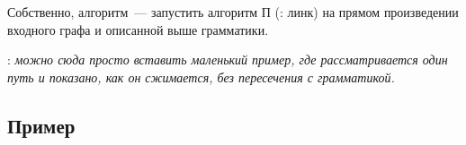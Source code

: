 Собственно, алгоритм~--- запустить алгоритм П (\TODO: линк) на прямом произведении входного графа и описанной выше грамматики.


\TODO: \textit{можно сюда просто вставить маленький пример, где рассматривается один путь и показано, как он сжимается, без пересечения с грамматикой.}


\subsection{Пример}

